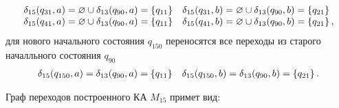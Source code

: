 \begin{enumerate}
\begin{align*}
\begin{array}{ll}
			      \delta_{15}(q_{31}, a) = \varnothing \cup \delta_{13}(q_{90}, a) = \left\{q_{11}\right\} & \delta_{15}(q_{31}, b) = \varnothing \cup \delta_{13}(q_{90}, b) = \left\{q_{21}\right\}  \\
			      \delta_{15}(q_{41}, a) = \varnothing \cup \delta_{13}(q_{90}, a) = \left\{q_{11}\right\} & \delta_{15}(q_{41}, b) = \varnothing \cup \delta_{13}(q_{90}, b) = \left\{q_{21}\right\},
		      \end{array}
	      \end{align*}
	      для нового начального состояния \(q_{150}\) переносятся все переходы из старого началльного состояния \(q_{90}\)
	      \begin{align*}
		      \begin{array}{ll}
			      \delta_{15}(q_{150}, a)  = \delta_{13}(q_{90}, a) = \left\{q_{11}\right\} & \delta_{15}(q_{150}, b)  =  \delta_{13}(q_{90}, b) = \left\{q_{21}\right\}.
		      \end{array}
	      \end{align*}
\end{enumerate}
Граф переходов построенного КА \(M_{15}\) примет вид:
